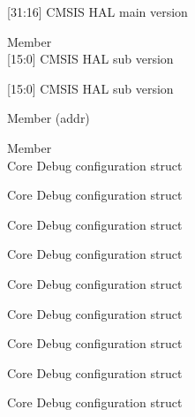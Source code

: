 \begin{DoxyRefList}
\label{deprecated__deprecated001316}%
%
\mbox{[}31\+:16\mbox{]} CMSIS HAL main version  
\item[Member \doxylink{_arduino_2_get_started_with_machine_learning_on_arduino_2tflite-micro-arduino-examples-main_2src9b5020400d57679b2ccc7c0f884d7684_a664c9e59952455ddeee28173b864fe9d}{\+\_\+\+\_\+\+SC300\+\_\+\+CMSIS\+\_\+\+VERSION\+\_\+\+SUB} ]\hfill \\
\label{deprecated__deprecated000658}%
%
\mbox{[}15\+:0\mbox{]} CMSIS HAL sub version 

\label{deprecated__deprecated001317}%
%
\mbox{[}15\+:0\mbox{]} CMSIS HAL sub version  
\item[Member \doxylink{arm__math__memory_8h_a9de2e0a5785be82866bcb96012282248}{\+\_\+\+\_\+\+SIMD32} (addr)]\hfill \\
\label{deprecated__deprecated001319}%
%
  
\item[Member \doxylink{group___c_m_s_i_s___core_debug_gab6e30a2b802d9021619dbb0be7f5d63d}{Core\+Debug} ]\hfill \\
\label{deprecated__deprecated000100}%
%
Core Debug configuration struct 

\label{deprecated__deprecated000154}%
%
Core Debug configuration struct 

\label{deprecated__deprecated000230}%
%
Core Debug configuration struct 

\label{deprecated__deprecated000293}%
%
Core Debug configuration struct 

\label{deprecated__deprecated000372}%
%
Core Debug configuration struct 

\label{deprecated__deprecated000448}%
%
Core Debug configuration struct 

\label{deprecated__deprecated000551}%
%
Core Debug configuration struct 

\label{deprecated__deprecated000653}%
%
Core Debug configuration struct 

\label{deprecated__deprecated000759}%
%
Core Debug configuration struct 


\end{DoxyRefList}
